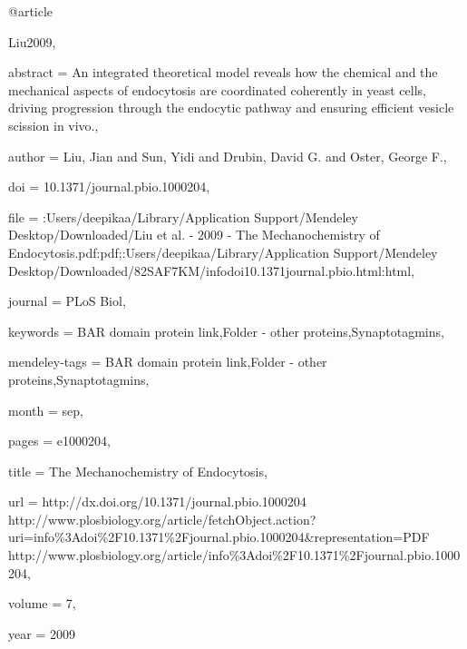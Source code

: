 @article{Liu2009,

abstract = {An integrated theoretical model reveals how the chemical and the mechanical aspects of endocytosis are coordinated coherently in yeast cells, driving progression through the endocytic pathway and ensuring efficient vesicle scission in vivo.},

author = {Liu, Jian and Sun, Yidi and Drubin, David G. and Oster, George F.},

doi = {10.1371/journal.pbio.1000204},

file = {:Users/deepikaa/Library/Application Support/Mendeley Desktop/Downloaded/Liu et al. - 2009 - The Mechanochemistry of Endocytosis.pdf:pdf;:Users/deepikaa/Library/Application Support/Mendeley Desktop/Downloaded/82SAF7KM/infodoi10.1371journal.pbio.html:html},

journal = {PLoS Biol},

keywords = {BAR domain protein link,Folder - other proteins,Synaptotagmins},

mendeley-tags = {BAR domain protein link,Folder - other proteins,Synaptotagmins},

month = {sep},

pages = {e1000204},

title = {{The Mechanochemistry of Endocytosis}},

url = {http://dx.doi.org/10.1371/journal.pbio.1000204 http://www.plosbiology.org/article/fetchObject.action?uri=info{\%}3Adoi{\%}2F10.1371{\%}2Fjournal.pbio.1000204{\&}representation=PDF http://www.plosbiology.org/article/info{\%}3Adoi{\%}2F10.1371{\%}2Fjournal.pbio.1000204},

volume = {7},

year = {2009}

}

